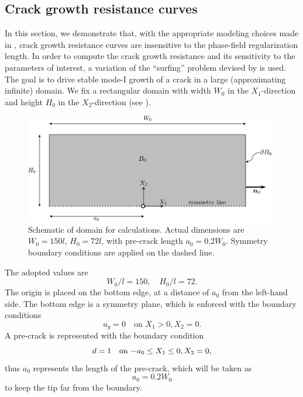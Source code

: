 \subsection{Crack growth resistance curves}

In this section, we demonstrate that, with the appropriate modeling choices made in , crack growth resistance curves are insensitive to the phase-field regularization length. In order to compute the crack growth resistance and its sensitivity to the parameters of interest, a variation of the ``surfing'' problem devised by \cite{hossain_effective_2014,brandon2020cohesive} is used.
The goal is to drive stable mode-I growth of a crack in a large (approximating infinite) domain.
We fix a rectangular domain with width $W_0$ in the $X_1$-direction and height $H_0$ in the $X_2$-direction (see ).
\begin{figure}[!htb]
  \centering
  \includegraphics[width=11cm]{Chapter5/figures/JR/domain.png}
  \caption{Schematic of domain for calculations. Actual dimensions are $W_0 = 150 l$, $H_0 = 72 l$, with pre-crack length $a_0 = 0.2 W_0$. Symmetry boundary conditions are applied on the dashed line.}
  \label{fig:domain}
\end{figure}
The adopted values are
\begin{equation}
  \label{eq:domain_size}
  W_0 / l = 150, \quad H_0 / l = 72.
\end{equation}
The origin is placed on the bottom edge, at a distance of $a_0$ from the left-hand side.
The bottom edge is a symmetry plane, which is enforced with the boundary conditions
\begin{equation}
  u_y = 0 \quad \text{on $X_1 > 0, X_2 = 0$}.
\end{equation}
A pre-crack is represented with the boundary condition
\begin{equation}
  \label{eq:phase_bc}
  d = 1 \quad \text{on $ -a_0 \leq X_1 \leq 0, X_2 = 0$},
\end{equation}
thus $a_0$ represents the length of the pre-crack, which will be taken as
\begin{equation}
  \label{eq:pre_crack_length}
  a_0 = 0.2 W_0
\end{equation}
to keep the tip far from the boundary.

